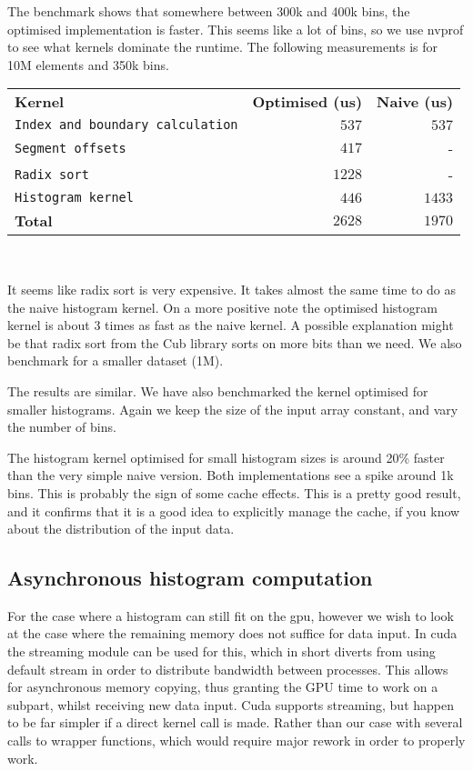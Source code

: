 \documentclass[12pt, a4paper, hidelinks]{article}
\newcommand{\fig}[3]{
\begin{figure}[h]
  \begin{center}
    \texttt{[image: ./img/\#1]}
  \end{center}
  \caption{#3}
  \label{fig:#1}
\end{figure}
}
\def\fatline{\Xhline{2\arrayrulewidth}}
\renewcommand{\tt}[1]{\texttt{#1}}
\renewcommand{\bf}[1]{\textbf{#1}}
\begin{document}
The benchmark shows that somewhere between 300k and 400k bins,
the optimised implementation is faster.
This seems like a lot of bins,
so we use nvprof to see what kernels dominate the runtime.
The following measurements is for 10M elements and 350k bins.

\begin{center}
  \begin{tabular}{l|r|r}
    \bf{Kernel} & \bf{Optimised (us)} & \bf{Naive (us)}   \\ \fatline
    \tt{Index and boundary calculation} & $537$  & $537$  \\ \hline
    \tt{Segment offsets}                & $417$  & -      \\ \hline
    \tt{Radix sort}                     & $1228$ & -      \\ \hline
    \tt{Histogram kernel}               & $446$  & $1433$ \\ \fatline
    \bf{Total}                          & $2628$ & $1970$ \\
  \end{tabular}\\
  \label{table:nvprof0}
\end{center}

It seems like radix sort is very expensive.
It takes almost the same time to do as the naive histogram kernel.
On a more positive note the optimised histogram kernel is about 3 times as
fast as the naive kernel. A possible explanation might be that radix sort
from the Cub library sorts on more bits than we need. We also benchmark
for a smaller dataset (1M).


The results are similar.
We have also benchmarked the kernel optimised for smaller histograms.
Again we keep the size of the input array constant, and vary the number of bins.


The histogram kernel optimised for small histogram sizes is around
20\% faster than the very simple naive version. Both implementations see a spike
around 1k bins.
This is probably the sign of some cache effects.
This is a pretty good result, and it confirms that it is a good idea to
explicitly manage the cache, if you know about the distribution of the input data.

\subsection{Asynchronous histogram computation}
For the case where a histogram can still fit on the gpu, however
we wish to look at the case where the remaining memory does not suffice
for data input.
In cuda the streaming module can be used for this, which in short diverts
from using default stream in order to distribute bandwidth between processes.
This allows for asynchronous memory copying, thus granting the GPU time to
work on a subpart, whilst receiving new data input. Cuda supports streaming,
but happen to be far simpler if a direct kernel call is made. Rather than our
case with several calls to wrapper functions, which would require major
rework in order to properly work.
\end{document}

